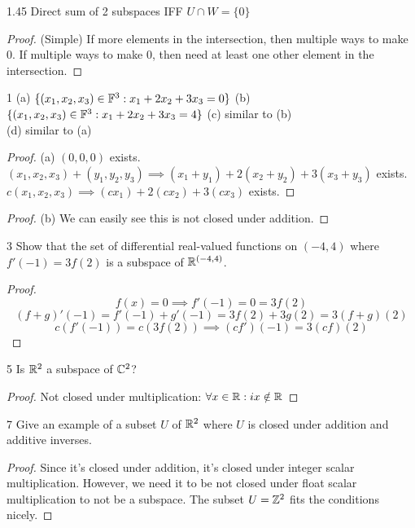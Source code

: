 \documentclass[12pt, letterpaper]{article}
\begin{document}
\begin{imp}{1.45 Direct sum of 2 subspaces}
IFF $U \cap W = \{0\}$
\begin{proof} (Simple)
If more elements in the intersection, then multiple ways to make 0.
If multiple ways to make 0, then need at least one other element in the intersection.
\end{proof}
\end{imp}

\begin{problem}{1}
(a) $\{(x_1,x_2,x_3)\in\mathbb{F}^3:x_1+2x_2+3x_3=0\}$
(b) $\{(x_1,x_2,x_3)\in\mathbb{F}^3:x_1+2x_2+3x_3=4\}$
(c) similar to (b)\\
(d) similar to (a)
\end{problem}
\begin{proof} (a)
$(0,0,0)$ exists.
$(x_1,x_2,x_3) + (y_1,y_2,y_3) \implies (x_1+y_1)+2(x_2+y_2)+3(x_3+y_3)$ exists.
$c(x_1,x_2,x_3) \implies (cx_1)+2(cx_2)+3(cx_3)$ exists.
\end{proof}
\begin{proof} (b)
We can easily see this is not closed under addition.
\end{proof}

\begin{problem}{3}
Show that the set of differential real-valued functions on $(-4,4)$
where $f'(-1)=3f(2)$ is a subspace of $\mathbb{R}^{(-4,4)}$.
\end{problem}
\begin{proof}
$$f(x) = 0 \implies f'(-1) = 0 = 3f(2)$$
$$(f+g)'(-1)=f'(-1)+g'(-1)=3f(2)+3g(2)=3(f+g)(2)$$
$$c(f'(-1))=c(3f(2))\implies (cf')(-1)=3(cf)(2)$$
\end{proof}

\begin{problem}{5}
Is $\mathbb{R}^2$ a subspace of $\mathbb{C}^2$?
\end{problem}
\begin{proof}
Not closed under multiplication: $\forall x\in \mathbb{R}: ix\notin\mathbb{R}$
\end{proof}

\begin{problem}{7}
Give an example of a subset $U$ of $\mathbb{R}^2$ 
where $U$ is closed under addition and additive inverses.
\end{problem}
\begin{proof}
Since it's closed under addition, it's closed under integer scalar multiplication.
However, we need it to be not closed under float scalar multiplication to not be a subspace.
The subset $U=\mathbb{Z}^2$ fits the conditions nicely. 
\end{proof}
\end{document}
